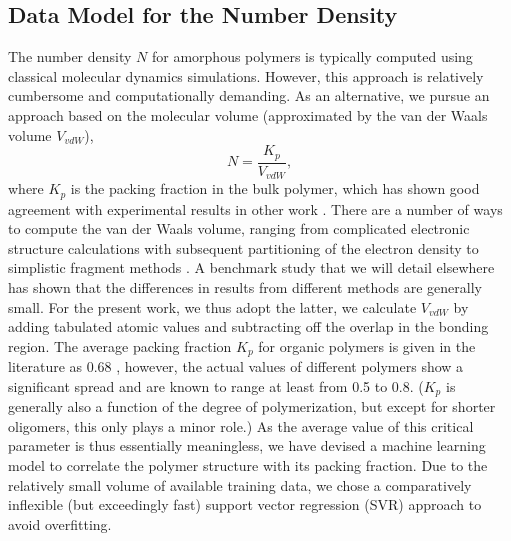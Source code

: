 \subsection{Data Model for the Number Density}
\label{subsec:numberdensity}
The number density $N$ for amorphous polymers is typically computed using classical molecular dynamics simulations. 
However, this approach is relatively cumbersome and computationally demanding.
As an alternative, we pursue an approach based on the molecular volume (approximated by the van der Waals volume $V_{vdW}$), \ie 
$$N=\frac{K_p}{V_{vdW}},$$
where $K_p$ is the packing fraction in the bulk polymer, which has shown good agreement with experimental results in other work \cite{Liu2008a,Terui2004}. 
There are a number of ways to compute the van der Waals volume, ranging from complicated electronic structure calculations with subsequent partitioning of the electron density to simplistic fragment methods \cite{Lu2012,Zhao2003}. A benchmark study that we will detail elsewhere has shown that the differences in results from different methods are generally small. For the present work, we thus adopt the latter, \ie  we calculate $V_{vdW}$ by adding tabulated atomic values \cite{Bondi1964} and subtracting off the overlap in the bonding region. 
The average packing fraction $K_p$ for organic polymers is given in the literature as 0.68 \cite{askadski2003}, however, the actual values of different polymers show a significant spread and are known to range at least from 0.5 to 0.8. ($K_p$ is generally also a function of the degree of polymerization, but except for shorter oligomers, this only plays a minor role.)  
As the average value of this critical parameter is thus essentially meaningless, we have devised a machine learning model to correlate the polymer structure with its packing fraction. Due to the relatively small volume of available training data, we chose a comparatively inflexible (but exceedingly fast) support vector regression (SVR) approach to avoid overfitting. 
